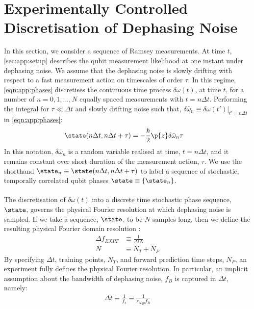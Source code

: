 \section{Experimentally Controlled Discretisation of Dephasing Noise \label{sec:app:exptres}} 
 In this section, we consider a sequence of Ramsey measurements. At time $t$, \cref{sec:app:setup} describes the qubit measurement likelihood at one instant under dephasing noise. We assume that the dephasing noise is slowly drifting with respect to a fast measurement action on timescales of order $\tau$. In this regime, \cref{eqn:app:phases} discretises the continuous time process $\delta\omega(t)$, at time $t$, for a number of $n= 0, 1, ..., N$ equally spaced measurements with $t = n \Delta t$. Performing the integral for $\tau \ll \Delta t$ and slowly drifting noise such that, $\delta\bar{\omega}_n \equiv \delta\omega(t')|_{t'=n \Delta t }$ in \cref{eqn:app:phases}:
\begin{align}
\state(n\Delta t, n\Delta t + \tau) & = -\frac{\hbar}{2}\p{z}\delta\bar{\omega}_n \tau \label{eqn:app:phases_constantdetuning}
\end{align}
In this notation, $\delta\bar{\omega}_n $ is a random variable realised at time, $t = n \Delta t$, and it remains constant over short duration of the measurement action, $\tau$.  We use the shorthand $\state_n \equiv \state(n\Delta t, n\Delta t + \tau)$ to label a sequence of stochastic, temporally correlated qubit phases $ \state \equiv \{\state_n \}$. 
 \\
 \\
 The discretisation of $\delta\omega(t)$ into  a discrete time stochastic phase sequence, $\state$, governs the physical Fourier resolution at which dephasing noise is sampled. If we take a sequence, $\state$, to be $N$ samples long, then we define the resulting physical Fourier domain resolution :
 \begin{align}
 \Delta f_{EXPT} & \equiv \frac{1}{\Delta t N} \\
 N & \equiv N_T + N_P
 \end{align} By specifying  $\Delta t$, training points, $ N_T$, and forward prediction time steps, $ N_P$, an experiment fully defines the physical Fourier resolution. In particular, an implicit assumption about the bandwidth of dephasing noise, $f_B$ is captured in $\Delta t$, namely:
\begin{align}
\Delta t \equiv \frac{1}{f_s} \equiv \frac{1}{r_{Nqy}f_B}
 \end{align}
